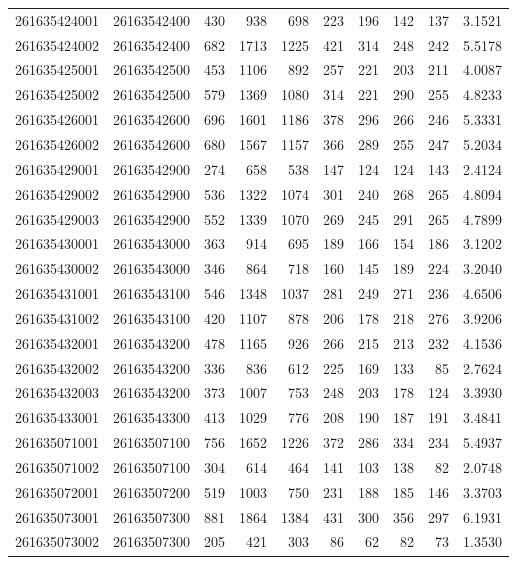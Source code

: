 \documentclass[
  11pt,
]{article}
\begin{document}
\begin{longtable}[t]{llrrrrrrrr}
261635424001 & 26163542400 & 430 & 938 & 698 & 223 & 196 & 142 & 137 & 3.1521\\
261635424002 & 26163542400 & 682 & 1713 & 1225 & 421 & 314 & 248 & 242 & 5.5178\\
261635425001 & 26163542500 & 453 & 1106 & 892 & 257 & 221 & 203 & 211 & 4.0087\\
261635425002 & 26163542500 & 579 & 1369 & 1080 & 314 & 221 & 290 & 255 & 4.8233\\
261635426001 & 26163542600 & 696 & 1601 & 1186 & 378 & 296 & 266 & 246 & 5.3331\\
261635426002 & 26163542600 & 680 & 1567 & 1157 & 366 & 289 & 255 & 247 & 5.2034\\
261635429001 & 26163542900 & 274 & 658 & 538 & 147 & 124 & 124 & 143 & 2.4124\\
261635429002 & 26163542900 & 536 & 1322 & 1074 & 301 & 240 & 268 & 265 & 4.8094\\
261635429003 & 26163542900 & 552 & 1339 & 1070 & 269 & 245 & 291 & 265 & 4.7899\\
261635430001 & 26163543000 & 363 & 914 & 695 & 189 & 166 & 154 & 186 & 3.1202\\
261635430002 & 26163543000 & 346 & 864 & 718 & 160 & 145 & 189 & 224 & 3.2040\\
261635431001 & 26163543100 & 546 & 1348 & 1037 & 281 & 249 & 271 & 236 & 4.6506\\
261635431002 & 26163543100 & 420 & 1107 & 878 & 206 & 178 & 218 & 276 & 3.9206\\
261635432001 & 26163543200 & 478 & 1165 & 926 & 266 & 215 & 213 & 232 & 4.1536\\
261635432002 & 26163543200 & 336 & 836 & 612 & 225 & 169 & 133 & 85 & 2.7624\\
261635432003 & 26163543200 & 373 & 1007 & 753 & 248 & 203 & 178 & 124 & 3.3930\\
261635433001 & 26163543300 & 413 & 1029 & 776 & 208 & 190 & 187 & 191 & 3.4841\\
261635071001 & 26163507100 & 756 & 1652 & 1226 & 372 & 286 & 334 & 234 & 5.4937\\
261635071002 & 26163507100 & 304 & 614 & 464 & 141 & 103 & 138 & 82 & 2.0748\\
261635072001 & 26163507200 & 519 & 1003 & 750 & 231 & 188 & 185 & 146 & 3.3703\\
261635073001 & 26163507300 & 881 & 1864 & 1384 & 431 & 300 & 356 & 297 & 6.1931\\
261635073002 & 26163507300 & 205 & 421 & 303 & 86 & 62 & 82 & 73 & 1.3530\\

\end{longtable}
\end{document}
